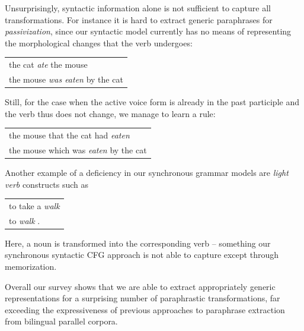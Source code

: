 \documentclass[11pt]{article}
\begin{document}
Unsurprisingly, syntactic information alone is not sufficient to
capture all transformations. For instance it is hard to extract
generic paraphrases for \emph{passivization}, since our syntactic
model currently has no means of representing the morphological changes that the
verb undergoes:
\begin{center}
\begin{tabular}{l}
  the cat \emph{ate} the mouse \\
  the mouse \emph{was eaten} by the cat \\
\end{tabular}

\end{center}
Still, for the case when the active voice form is already in
the past participle and the verb thus does not change, we manage to
learn a rule:
\begin{center}
\begin{tabular}{l}
  the mouse that the cat had \emph{eaten} \\
  the mouse which was \emph{eaten} by the cat \\
\end{tabular}
\end{center}
%
Another example of a deficiency in our synchronous grammar models are
\emph{light verb} constructs such as
\begin{center}
\begin{tabular}{l}
  to take a \emph{walk} \\
  to \emph{walk} .
\end{tabular}
\end{center}
Here, a noun is transformed into the corresponding verb -- something
our synchronous syntactic CFG approach is not able to capture except
through memorization.

Overall our survey shows that we are able to extract appropriately generic
representations for a surprising number of paraphrastic
transformations, far exceeding the expressiveness of previous
approaches to paraphrase extraction from bilingual parallel corpora.



\end{document}
